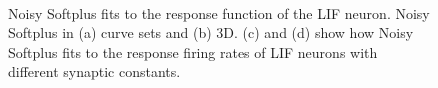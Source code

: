 \documentclass[runningheads,a4paper]{llncs}
\begin{document}
	\begin{figure}[htb!]
		\centering
		\\
		\caption{
			Noisy Softplus fits to the response function of the LIF neuron.
			Noisy Softplus in (a) curve sets and (b) 3D.
			(c) and (d) show how Noisy Softplus fits to the response firing rates of LIF neurons with different synaptic constants.}
		\label{fig:nsp}
	\end{figure}
	
\end{document}
